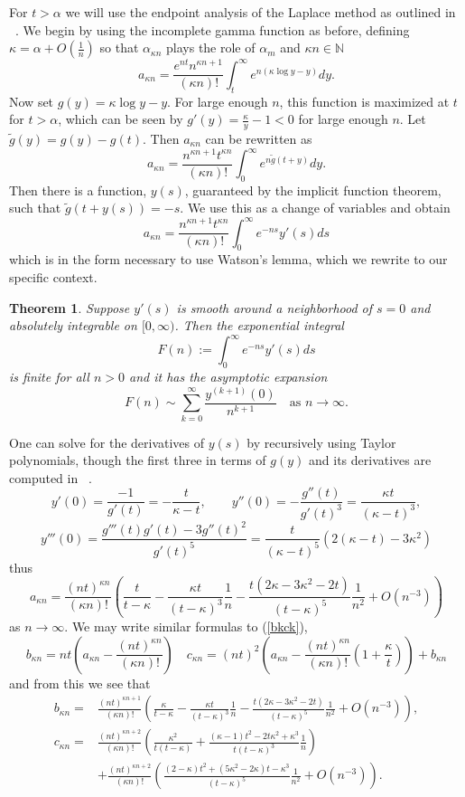 \documentclass[12pt]{amsart}
\newtheorem{theorem}{Theorem}
\theoremstyle{remark}
\begin{document}
For $t>\alpha$ we will use the endpoint analysis of the Laplace method as outlined in ~\cite[\S3.3]{Miller}.  We begin by using the incomplete gamma function as before, defining $\kappa=\alpha+O(\frac{1}{n})$ so that $\alpha_{\kappa n}$ plays the role of $\alpha_m$ and $\kappa n\in\mathbb{N}$
\[a_{\kappa n}=\frac{e^{nt}n^{\kappa n+1}}{(\kappa n)!}\int_{t}^\infty e^{n(\kappa\log y-y)}dy.\]
Now set $g(y)=\kappa\log y-y$.  For large enough $n$, this function is maximized at $t$ for $t>\alpha$, which can be seen by $g'(y)=\frac{\kappa}{y}-1<0$ for large enough $n$.  Let $\tilde{g}(y)=g(y)-g(t)$.  Then $a_{\kappa n}$ can be rewritten as
\[a_{\kappa n}=\frac{n^{\kappa n+1}t^{\kappa n}}{(\kappa n)!}\int_{0}^\infty e^{n\tilde{g}(t+y)}dy.\]
Then there is a function, $y(s)$, guaranteed by the implicit function theorem, such that $\tilde{g}(t+y(s))=-s$.  We use this as a change of variables and obtain
\[a_{\kappa n}=\frac{n^{\kappa n+1}t^{\kappa n}}{(\kappa n)!}\int_{0}^\infty e^{-ns}y'(s)ds\]
which is in the form necessary to use Watson's lemma, which we rewrite to our specific context.
\begin{theorem}
	Suppose $y'(s)$ is smooth around a neighborhood of $s=0$ and absolutely integrable on $[0,\infty)$.  Then the 
	exponential integral
	\[F(n):=\int_0^\infty e^{-ns}y'(s)ds\]
	is finite for all $n>0$ and it has the asymptotic expansion
	\[F(n)\sim\sum_{k=0}^\infty\frac{y^{(k+1)}(0)}
	{n^{k+1}}\quad\text{as $n\rightarrow\infty$.}\]
\end{theorem}
One can solve for the derivatives of $y(s)$ by recursively using Taylor polynomials, though the first three in terms of $g(y)$ and its derivatives are computed in ~\cite{Miller}.
\[y'(0)=\frac{-1}{g'(t)}=-\frac{t}{\kappa-t},\qquad y''(0)=-\frac{g''(t)}{g'(t)^3}=\frac{\kappa t}{(\kappa-t)^3},\]
\[y'''(0)=\frac{g'''(t)g'(t)-3g''(t)^2}{g'(t)^5}=\frac{t}{(\kappa-t)^5}\left(2(\kappa-t)-3\kappa^2\right)\]
thus
\begin{equation}\label{Milleran}
	a_{\kappa n}=\frac{(nt)^{\kappa n}}{(\kappa n)!}
	\left(\frac{t}{t-\kappa}-\frac{\kappa t}{(t-\kappa)^3}\frac{1}{n}
	-\frac{t(2\kappa-3\kappa^2-2t)}{(t-\kappa)^5}\frac{1}{n^2}+O(n^{-3})\right)
\end{equation}
as $n\rightarrow\infty$.  We may write similar formulas to (\ref{bkck}),
\[b_{\kappa n}=nt\left(a_{\kappa n}-\frac{(nt)^{\kappa n}}{(\kappa n)!}\right)\quad c_{\kappa n}=(nt)^2\left(a_{\kappa n}-\frac{(nt)^{\kappa n}}{(\kappa n)!}\left(1+\frac{\kappa}{t}\right)\right)+b_{\kappa n}\]
and from this we see that
\begin{align}
	b_{\kappa n}=&\frac{(nt)^{\kappa n+1}}{(\kappa n)!}
		\left(\frac{\kappa}{t-\kappa}-\frac{\kappa t}{(t-\kappa)^3}\frac{1}{n}
		-\frac{t(2\kappa-3\kappa^2-2t)}{(t-\kappa)^5}\frac{1}{n^2}
		+O(n^{-3})\right),	
		\label{Millerbn}
	\\c_{\kappa n}=&\frac{(nt)^{\kappa n+2}}{(\kappa n)!}
		\left(\frac{\kappa^2}{t(t-\kappa)}+\frac{(\kappa-1)t^2-2t\kappa^2
		+\kappa^3}{t(t-\kappa)^3}\frac{1}{n}\right)
		\label{Millercn}
	\\ &+\frac{(nt)^{\kappa n+2}}{(\kappa n)!}
		\left(\frac{(2-\kappa)t^2+(5\kappa^2-2\kappa) t-\kappa^3}{(t-\kappa)^5}
		\frac{1}{n^2}+O(n^{-3})\right).\nonumber
\end{align}
\end{document}
